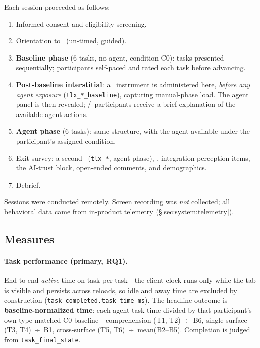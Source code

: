 
Each session proceeded as follows:
\begin{enumerate}
  \item Informed consent and eligibility screening.
  \item Orientation to \Weld\ (un-timed, guided).
  \item \textbf{Baseline phase} (6 tasks, no agent, condition C0): tasks
    presented sequentially; participants self-paced and rated each task before
    advancing.
  \item \textbf{Post-baseline interstitial}: a \NASATLX\ instrument is
    administered here, \emph{before any agent exposure}
    (\texttt{tlx\_*\_baseline}), capturing manual-phase load. The agent panel is
    then revealed; \CII/\CIII\ participants receive a brief explanation of the
    available agent actions.
  \item \textbf{Agent phase} (6 tasks): same structure, with the agent available
    under the participant's assigned condition.
  \item Exit survey: a second \NASATLX\ (\texttt{tlx\_*}, agent phase), \SUS,
    integration-perception items, the AI-trust block, open-ended comments, and
    demographics.
  \item Debrief.
\end{enumerate}

Sessions were conducted remotely. Screen recording was \emph{not} collected; all
behavioral data came from in-product telemetry (\S\ref{sec:system:telemetry}).

\subsection{Measures}
\label{sec:study:measures}

\paragraph{Task performance (primary, RQ1).}
End-to-end \emph{active} time-on-task per task---the client clock runs only while
the tab is visible and persists across reloads, so idle and away time are
excluded by construction (\texttt{task\_completed.task\_time\_ms}). The headline
outcome is \textbf{baseline-normalized time}: each agent-task time divided by that
participant's own type-matched C0 baseline---comprehension (T1, T2)~$\div$~B6,
single-surface (T3, T4)~$\div$~B1, cross-surface (T5, T6)~$\div$~mean(B2--B5).
Completion is judged from \texttt{task\_final\_state}.

